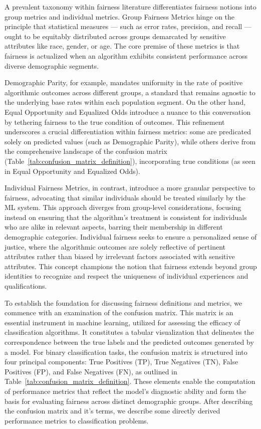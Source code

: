 A prevalent taxonomy within fairness literature differentiates fairness notions into group metrics and individual metrics. Group Fairness Metrics hinge on the principle that statistical measures — such as error rates, precision, and recall — ought to be equitably distributed across groups demarcated by sensitive attributes like race, gender, or age. The core premise of these metrics is that fairness is actualized when an algorithm exhibits consistent performance across diverse demographic segments.

Demographic Parity, for example, mandates uniformity in the rate of positive algorithmic outcomes across different groups, a standard that remains agnostic to the underlying base rates within each population segment. On the other hand, Equal Opportunity and Equalized Odds introduce a nuance to this conversation by tethering fairness to the true condition of outcomes. This refinement underscores a crucial differentiation within fairness metrics: some are predicated solely on predicted values (such as Demographic Parity), while others derive from the comprehensive landscape of the confusion matrix (Table~\ref{tab:confusion_matrix_definition}), incorporating true conditions (as seen in Equal Opportunity and Equalized Odds).

Individual Fairness Metrics, in contrast, introduce a more granular perspective to fairness, advocating that similar individuals should be treated similarly by the ML system. This approach diverges from group-level considerations, focusing instead on ensuring that the algorithm’s treatment is consistent for individuals who are alike in relevant aspects, barring their membership in different demographic categories. Individual fairness seeks to ensure a personalized sense of justice, where the algorithmic outcomes are solely reflective of pertinent attributes rather than biased by irrelevant factors associated with sensitive attributes. This concept champions the notion that fairness extends beyond group identities to recognize and respect the uniqueness of individual experiences and qualifications.

To establish the foundation for discussing fairness definitions and metrics, we commence with an examination of the confusion matrix. This matrix is an essential instrument in machine learning, utilized for assessing the efficacy of classification algorithms. It constitutes a tabular visualization that delineates the correspondence between the true labels and the predicted outcomes generated by a model. For binary classification tasks, the confusion matrix is structured into four principal components: True Positives (TP), True Negatives (TN), False Positives (FP), and False Negatives (FN), as outlined in Table~\ref{tab:confusion_matrix_definition}. These elements enable the computation of performance metrics that reflect the model's diagnostic ability and form the basis for evaluating fairness across distinct demographic groups. After describing the confusion matrix and it's terms, we describe some directly derived performance metrics to classification problems.

